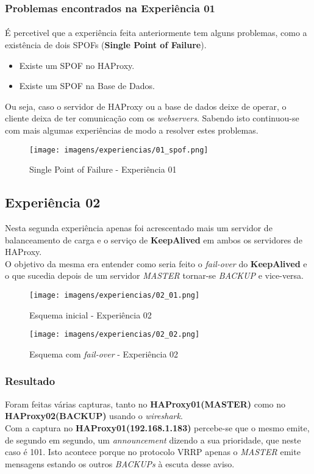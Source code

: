 \documentclass{report}
\begin{document}
\subsubsection{Problemas encontrados na Experiência 01}
\paragraph{}
É percetivel que a experiência feita anteriormente tem alguns problemas, como a existência de dois SPOFs (\textbf{Single Point of Failure}).
\begin{itemize}
  \item Existe um SPOF no HAProxy.
  \item Existe um SPOF na Base de Dados.
\end{itemize}
Ou seja, caso o servidor de HAProxy ou a base de dados deixe de operar, o cliente deixa de ter comunicação com os \emph{webservers}. Sabendo isto continuou-se com mais algumas experiências de modo a resolver estes problemas.

\begin{figure}[H]
\center
\texttt{[image: imagens/experiencias/01\_spof.png]}
\caption{Single Point of Failure - Experiência 01}
\label{fig.nav}
\end{figure}


\subsection{Experiência 02}
Nesta segunda experiência apenas foi acrescentado mais um servidor de balanceamento de carga e o serviço de \textbf{KeepAlived} em ambos os servidores de HAProxy.\\
O objetivo da mesma era entender como seria feito o \emph{fail-over} do \textbf{KeepAlived} e o que sucedia depois de um servidor \emph{MASTER} tornar-se \emph{BACKUP} e vice-versa.

\begin{figure}[H]
\center
\texttt{[image: imagens/experiencias/02\_01.png]}
\caption{Esquema inicial - Experiência 02}
\label{fig.nav}
\end{figure}

\begin{figure}[H]
\center
\texttt{[image: imagens/experiencias/02\_02.png]}
\caption{Esquema com \emph{fail-over} - Experiência 02}
\label{fig.nav}
\end{figure}


\subsubsection{Resultado}
Foram feitas várias capturas, tanto no \textbf{HAProxy01(MASTER)} como no \textbf{HAProxy02(BACKUP)} usando o \emph{wireshark}.\\
Com a captura no \textbf{HAProxy01(192.168.1.183)} percebe-se que o mesmo emite, de segundo em segundo, um \emph{announcement} dizendo a sua prioridade, que neste caso é 101. Isto acontece porque no protocolo VRRP apenas o \emph{MASTER} emite mensagens estando os outros \emph{BACKUPs} à escuta desse aviso.
\end{document}
